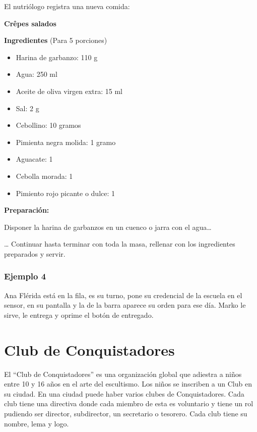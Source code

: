 \documentclass[
  letterpaper,
  DIV=11,
  numbers=noendperiod]{scrreprt}
\providecommand{\tightlist}{%
  \setlength{\itemsep}{0pt}\setlength{\parskip}{0pt}}\usepackage{longtable,booktabs,array}
\begin{document}
El nutriólogo registra una nueva comida:

\textbf{Crêpes salados}

\textbf{Ingredientes} (Para 5 porciones)

\begin{itemize}
\tightlist
\item
  Harina de garbanzo: 110 g
\item
  Agua: 250 ml
\item
  Aceite de oliva virgen extra: 15 ml
\item
  Sal: 2 g
\item
  Cebollino: 10 gramos
\item
  Pimienta negra molida: 1 gramo
\item
  Aguacate: 1
\item
  Cebolla morada: 1
\item
  Pimiento rojo picante o dulce: 1
\end{itemize}

\textbf{Preparación:}

Disponer la harina de garbanzos en un cuenco o jarra con el agua\ldots{}

\ldots{} Continuar hasta terminar con toda la masa, rellenar con los
ingredientes preparados y servir.

\subsection{Ejemplo 4}\label{ejemplo-4}

Ana Flérida está en la fila, es su turno, pone su credencial de la
escuela en el sensor, en su pantalla y la de la barra aparece su orden
para ese día. Marko le sirve, le entrega y oprime el botón de entregado.
 


\chapter{Club de Conquistadores}\label{club-de-conquistadores}

El ``Club de Conquistadores'' es una organización global que adiestra a
niños entre 10 y 16 años en el arte del escultismo. Los niños se
inscriben a un Club en su ciudad. En una ciudad puede haber varios
clubes de Conquistadores. Cada club tiene una directiva donde cada
miembro de esta es voluntario y tiene un rol pudiendo ser director,
subdirector, un secretario o tesorero. Cada club tiene su nombre, lema y
logo.
\end{document}
